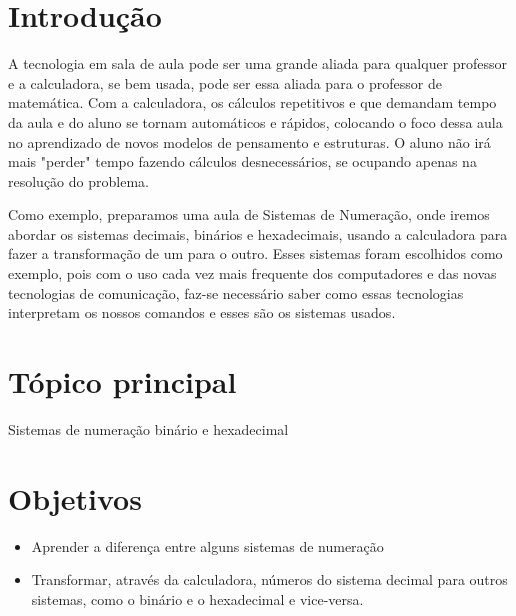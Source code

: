 \documentclass[12pt, openright, a4paper, brazil, openany, oneside]{abntex2}
\begin{document}


\frenchspacing 


\imprimircapa

\imprimirfolhaderosto*

\ABNTEXchapterfont

\tableofcontents*
\cleardoublepage
\textual

\chapter*[Introdução]{Introdução}


A tecnologia em sala de aula pode ser uma grande aliada para qualquer professor e a calculadora, se bem usada, pode ser essa aliada para o professor de matemática.
Com a calculadora, os cálculos repetitivos e que demandam tempo da aula e do aluno se tornam automáticos e rápidos, colocando o foco dessa aula no aprendizado de novos modelos de pensamento e estruturas. O aluno não irá mais "perder" tempo fazendo cálculos desnecessários, se ocupando apenas na resolução do problema.

Como exemplo, preparamos uma aula de Sistemas de Numeração, onde iremos abordar os sistemas decimais, binários e hexadecimais, usando a calculadora para fazer a transformação de um para o outro. Esses sistemas foram escolhidos como exemplo, pois com o uso cada vez mais frequente dos computadores e das novas tecnologias de comunicação, faz-se necessário saber como essas tecnologias interpretam os nossos comandos e esses são os sistemas usados. 



\chapter{Tópico principal}

Sistemas de numeração binário e hexadecimal

\vspace{1cm}


\chapter{Objetivos}

\begin{itemize}
    \item Aprender a diferença entre alguns sistemas de numeração
    \item Transformar, através da calculadora, números do sistema decimal para outros  sistemas, como o binário e o hexadecimal e vice-versa.
\end{itemize}
\end{document}
